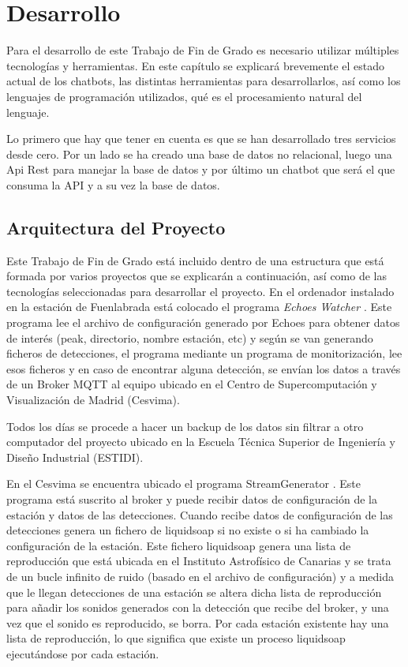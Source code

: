 \chapter{Desarrollo}

Para el desarrollo de este Trabajo de Fin de Grado es necesario utilizar múltiples tecnologías y herramientas. En este capítulo se explicará brevemente el estado actual de los chatbots, las distintas herramientas para desarrollarlos, así como los lenguajes de programación utilizados, qué es el procesamiento natural del lenguaje.

Lo primero que hay que tener en cuenta es que se han desarrollado tres servicios desde cero. Por un lado se ha creado una base de datos no relacional, luego una Api Rest para manejar la base de datos y por último un chatbot que será el que consuma la API y a su vez la base de datos. 

\section{Arquitectura del Proyecto}

Este Trabajo de Fin de Grado está incluido dentro de una estructura que está formada por varios proyectos que se explicarán a continuación, así como de las tecnologías seleccionadas para desarrollar el proyecto.
En el ordenador instalado en la estación de Fuenlabrada está colocado el programa \textit{Echoes Watcher} \cite{echoesWatcher}. Este programa lee el archivo de configuración  generado por Echoes para obtener datos de interés (peak, directorio, nombre estación, etc) y según se van generando ficheros de detecciones, el programa mediante un programa de monitorización, lee esos ficheros y en caso de encontrar alguna detección, se envían los datos a través de un Broker MQTT \cite{singh2015secure} al equipo ubicado en el Centro de Supercomputación y Visualización de Madrid (Cesvima).

Todos los días se procede a hacer un backup de los datos sin filtrar a otro computador del proyecto ubicado en la Escuela Técnica Superior de Ingeniería y Diseño Industrial (ESTIDI).

En el Cesvima se encuentra ubicado el programa StreamGenerator \cite{StreamGenerator}. Este programa está suscrito al broker y puede recibir datos de configuración de la estación y datos de las detecciones. Cuando recibe datos de configuración de las detecciones genera un fichero de liquidsoap \cite{liquidsoap} si no existe o si ha cambiado la configuración de la estación. Este fichero liquidsoap genera una lista de reproducción que está ubicada en el Instituto Astrofísico de Canarias y se trata de un bucle infinito de ruido (basado en el archivo de configuración) y a medida que le llegan detecciones de una estación se altera dicha lista de reproducción para añadir los sonidos generados con la detección que recibe del broker, y una vez que el sonido es reproducido, se borra. 
Por cada estación existente hay una lista de reproducción, lo que significa que existe un proceso liquidsoap ejecutándose por cada estación.  

